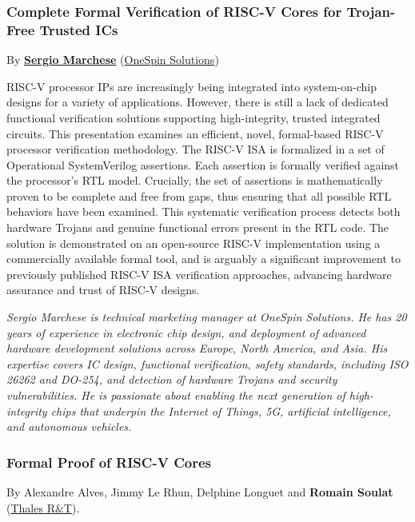 \documentclass[a4paper, 10pt]{article}
\begin{document}
{\subsubsection{Complete Formal Verification of RISC-V Cores for Trojan-Free Trusted ICs}
\label{sec:orga5c9455}
By \textbf{\href{https://www.linkedin.com/in/sergiomarchese}{Sergio Marchese}} (\href{https://www.onespin.com}{OneSpin Solutions})

RISC-V processor IPs are increasingly being integrated into
system-on-chip designs for a variety of applications. However, there
is still a lack of dedicated functional verification solutions
supporting high-integrity, trusted integrated circuits. This
presentation examines an efficient, novel, formal-based RISC-V
processor verification methodology. The RISC-V ISA is formalized in a
set of Operational SystemVerilog assertions. Each assertion is
formally verified against the processor’s RTL model. Crucially, the
set of assertions is mathematically proven to be complete and free
from gaps, thus ensuring that all possible RTL behaviors have been
examined. This systematic verification process detects both hardware
Trojans and genuine functional errors present in the RTL code. The
solution is demonstrated on an open-source RISC-V implementation using
a commercially available formal tool, and is arguably a significant
improvement to previously published RISC-V ISA verification
approaches, advancing hardware assurance and trust of RISC-V designs.

\emph{\footnotesize Sergio Marchese is technical marketing manager at OneSpin Solutions. He has 20 years of experience in electronic chip design, and deployment of advanced hardware development solutions across Europe, North America, and Asia. His expertise covers IC design, functional verification, safety standards, including ISO 26262 and DO-254, and detection of hardware Trojans and security vulnerabilities. He is passionate about enabling the next generation of high-integrity chips that underpin the Internet of Things, 5G, artificial intelligence, and autonomous vehicles.}

\subsubsection{Formal Proof of RISC-V Cores}
\label{sec:orgd8322bb}
By Alexandre Alves, Jimmy Le Rhun, Delphine Longuet and \textbf{Romain
Soulat} (\href{https://www.thalesgroup.com/en/global/innovation/research-and-technology}{Thales R\&T}).

}
\end{document}
